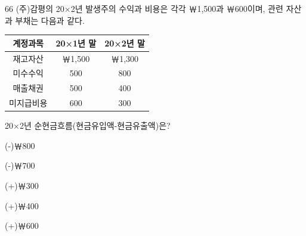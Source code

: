 \begin{question}{66}
(주)감평의 20×2년 발생주의 수익과 비용은 각각 ￦1,500과 ￦600이며, 관련 자산과 부채는 다음과 같다.

{\small\centering\begin{tabular}{|c|c|c|}\hline
계정과목 & 20×1년 말 & 20×2년 말 \\ \hline
재고자산 & ￦1,500 & ￦1,300 \\ \hline
미수수익 & 500 & 800 \\ \hline
매출채권 & 500 & 400 \\ \hline
미지급비용 & 600 & 300 \\ \hline
\end{tabular}\par}
\vspace{4pt}
20×2년 순현금흐름(현금유입액-현금유출액)은?
\begin{choices}
  \item (-)￦800
  \item (-)￦700
  \item (+)￦300
  \item (+)￦400
  \item (+)￦600
\end{choices}
\end{question}
